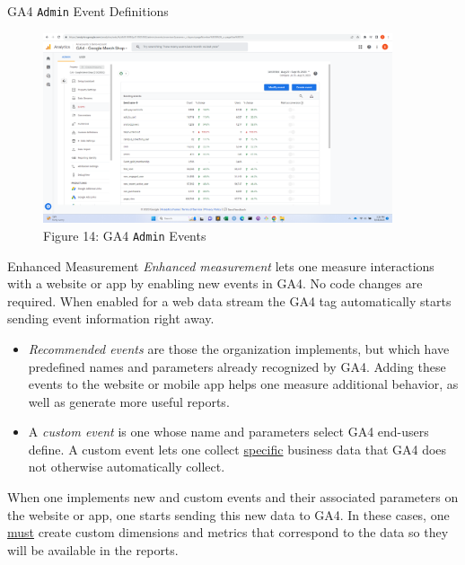 \documentclass[pdf]{beamer}
\theoremstyle{remark}
\theoremstyle{definition}
\begin{document}
\begin{frame}[t]{GA4 \texttt{Admin} Event Definitions}
\begin{figure}[htbp]
  \captionsetup{justification=centering}
  \includegraphics[height=5.6cm, trim=1.5cm 0.0cm 2.0cm 0.0cm width=5.6cm]{Images/G4A_7a_091923_Admin_Events.png}
  \caption{Figure {\color{franklinblue} 14}: GA4 \texttt{Admin} Events}
\end{figure}
\end{frame}

\begin{frame}[t]{Enhanced Measurement}
\small
\textit{Enhanced measurement} lets one measure interactions with a website or app by enabling new events in GA4. No code changes are required.  When enabled for a web data stream the GA4 tag automatically starts sending event information right away. \\
\vspace{1.5ex}
\begin{itemize}
  \item \textit{Recommended events} are those the organization implements, but which have predefined names and parameters already recognized by GA4. Adding these events to the website or mobile app helps one measure additional behavior, as well as generate more useful reports.
  \item  A \textit{custom event} is one whose name and parameters select GA4 end-users define. A custom event lets one collect \underline{specific} business data that GA4 does not otherwise automatically collect.  
\end{itemize}
When one implements new and custom events and their associated parameters on the website or app, one starts sending this new data to GA4. In these cases, one \underline{must} create custom dimensions and metrics that correspond to the data so they will be available in the reports.
\end{frame}
\end{document}
